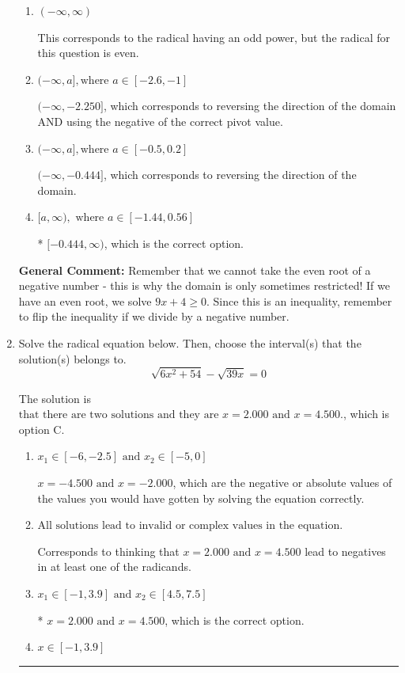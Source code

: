 \documentclass{extbook}[14pt]
\newcommand{\litem}[1]{\item #1

\rule{\textwidth}{0.4pt}}
\begin{document}
\begin{enumerate}
{\begin{enumerate}[label=\Alph*.]
$[-2.250, \infty)$, which corresponds to using the negative of the correct pivot value.
\item \( (-\infty, \infty) \)

This corresponds to the radical having an odd power, but the radical for this question is even.
\item \( (-\infty, a], \text{where } a \in [-2.6, -1] \)

$(-\infty, -2.250]$, which corresponds to reversing the direction of the domain AND using the negative of the correct pivot value.
\item \( (-\infty, a], \text{where } a \in [-0.5, 0.2] \)

 $(-\infty, -0.444]$, which corresponds to reversing the direction of the domain.
\item \( [a, \infty), \text{ where } a \in [-1.44, 0.56] \)

* $[-0.444, \infty)$, which is the correct option.
\end{enumerate}

\textbf{General Comment:} Remember that we cannot take the even root of a negative number - this is why the domain is only sometimes restricted! If we have an even root, we solve $9 x + 4 \geq 0$. Since this is an inequality, remember to flip the inequality if we divide by a negative number.
}
\litem{
Solve the radical equation below. Then, choose the interval(s) that the solution(s) belongs to.
\[ \sqrt{6 x^2 + 54} - \sqrt{39 x} = 0 \]

The solution is \( \text{that there are two solutions and they are } x = 2.000 \text{ and } x = 4.500. \), which is option C.\begin{enumerate}[label=\Alph*.]
\item \( x_1 \in [-6, -2.5] \text{ and } x_2 \in [-5,0] \)

$x = -4.500 \text{ and } x = -2.000$, which are the negative or absolute values of the values you would have gotten by solving the equation correctly.
\item \( \text{All solutions lead to invalid or complex values in the equation.} \)

Corresponds to thinking that $x = 2.000 \text{ and } x = 4.500$ lead to negatives in at least one of the radicands.
\item \( x_1 \in [-1, 3.9] \text{ and } x_2 \in [4.5,7.5] \)

* $x = 2.000 \text{ and } x = 4.500$, which is the correct option.
\item \( x \in [-1,3.9] \)


\end{enumerate}}
\end{enumerate}
\end{document}
